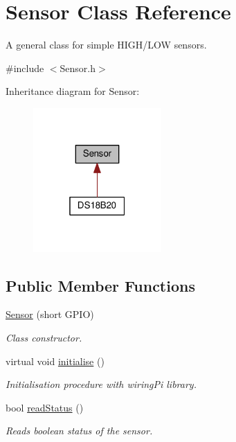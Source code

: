 \hypertarget{classSensor}{}\section{Sensor Class Reference}
\label{classSensor}


A general class for simple H\+I\+G\+H/\+L\+OW sensors.  




{\ttfamily \#include $<$Sensor.\+h$>$}



Inheritance diagram for Sensor\+:\nopagebreak
\begin{figure}[H]
\begin{center}
\leavevmode
\includegraphics[width=139pt]{classSensor__inherit__graph}
\end{center}
\end{figure}
\subsection*{Public Member Functions}
\begin{DoxyCompactItemize}
\item 
\mbox{\hyperlink{classSensor_a3909b52adbe404d4ab637163001e8c86}{Sensor}} (short G\+P\+IO)
\begin{DoxyCompactList}\small\item\em Class constructor. \end{DoxyCompactList}\item 
\mbox{\label{classSensor_af6f7d509e560240dfc5b1def0d87c26f}} 
virtual void \mbox{\hyperlink{classSensor_af6f7d509e560240dfc5b1def0d87c26f}{initialise}} ()
\begin{DoxyCompactList}\small\item\em Initialisation procedure with wiring\+Pi library. \end{DoxyCompactList}\item 
\mbox{\label{classSensor_a5d235b5abfb0446c8a5aa378630945fa}} 
bool \mbox{\hyperlink{classSensor_a5d235b5abfb0446c8a5aa378630945fa}{read\+Status}} ()
\begin{DoxyCompactList}\small\item\em Reads boolean status of the sensor. \end{DoxyCompactList}\end{DoxyCompactItemize}
